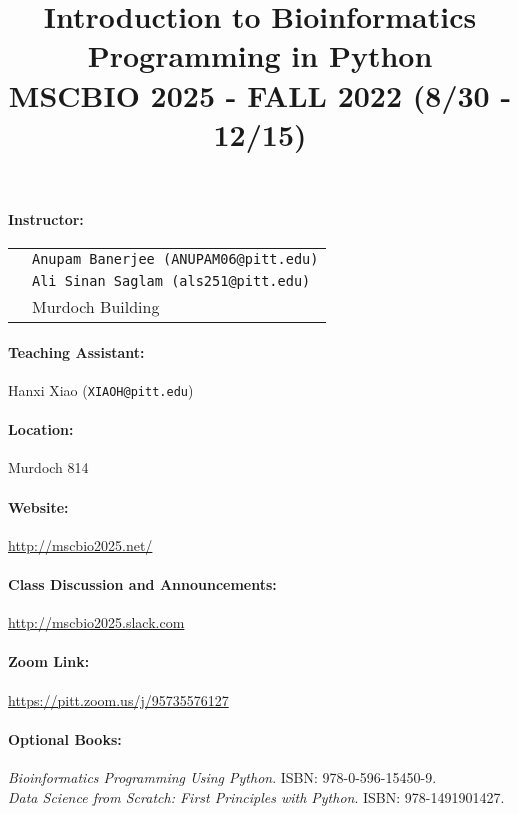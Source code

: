 \documentclass[11pt,letterpaper,oneside]{article}
\title{\bf \large \vspace{-.5in} Introduction to Bioinformatics Programming in Python\\MSCBIO 2025 - FALL 2022 (8/30 - 12/15)}
\author{}
\date{}
\begin{document}
\maketitle
\vspace{-.5in}
\thispagestyle{empty}
\vspace{-.25in}

\paragraph*{Instructor:} 
\begin{tabular}[t]{ll}
 & \texttt{Anupam Banerjee (ANUPAM06@pitt.edu)} \\
 & \texttt{Ali Sinan Saglam (als251@pitt.edu)} \\
 & Murdoch Building\\
\end{tabular}

\paragraph*{Teaching Assistant:} Hanxi Xiao (\texttt{XIAOH@pitt.edu})
\paragraph*{Location:} Murdoch 814
\paragraph*{Website:} \url{http://mscbio2025.net/}
\paragraph*{Class Discussion and Announcements:} \url{http://mscbio2025.slack.com}
\paragraph*{Zoom Link:} \url{https://pitt.zoom.us/j/95735576127}
\paragraph*{Optional Books:} {\it Bioinformatics Programming Using Python}.  ISBN: 978-0-596-15450-9. \\
{\it Data Science from Scratch: First Principles with Python}. ISBN: 978-1491901427.
\end{document}
